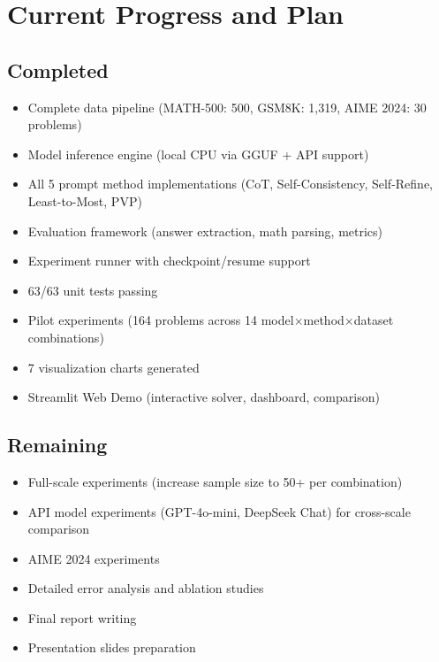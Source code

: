\documentclass[conference]{IEEEtran}
\begin{document}
\section{Current Progress and Plan}

\subsection{Completed}

\begin{itemize}
    \item Complete data pipeline (MATH-500: 500, GSM8K: 1,319, AIME 2024: 30 problems)
    \item Model inference engine (local CPU via GGUF + API support)
    \item All 5 prompt method implementations (CoT, Self-Consistency, Self-Refine, Least-to-Most, PVP)
    \item Evaluation framework (answer extraction, math parsing, metrics)
    \item Experiment runner with checkpoint/resume support
    \item 63/63 unit tests passing
    \item Pilot experiments (164 problems across 14 model$\times$method$\times$dataset combinations)
    \item 7 visualization charts generated
    \item Streamlit Web Demo (interactive solver, dashboard, comparison)
\end{itemize}

\subsection{Remaining}

\begin{itemize}
    \item Full-scale experiments (increase sample size to 50+ per combination)
    \item API model experiments (GPT-4o-mini, DeepSeek Chat) for cross-scale comparison
    \item AIME 2024 experiments
    \item Detailed error analysis and ablation studies
    \item Final report writing
    \item Presentation slides preparation
\end{itemize}
\end{document}
